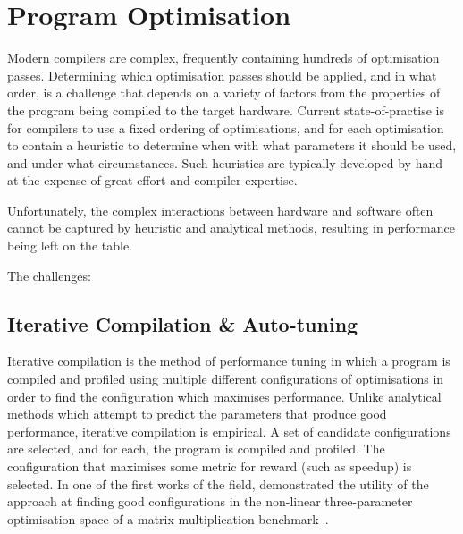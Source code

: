 \section{Program Optimisation}
\label{sec:related-work-optimisation}

Modern compilers are complex, frequently containing hundreds of optimisation passes. Determining which optimisation passes should be applied, and in what order, is a challenge that depends on a variety of factors from the properties of the program being compiled to the target hardware. Current state-of-practise is for compilers to use a fixed ordering of optimisations, and for each optimisation to contain a heuristic to determine when with what parameters it should be used, and under what circumstances. Such heuristics are typically developed by hand at the expense of great effort and compiler expertise.

Unfortunately, the complex interactions between hardware and software often cannot be captured by heuristic and analytical methods, resulting in performance being left on the table.

The challenges:




\subsection{Iterative Compilation \& Auto-tuning}

Iterative compilation is the method of performance tuning in which a program is compiled and profiled using multiple different configurations of optimisations in order to find the configuration which maximises performance. Unlike analytical methods which attempt to predict the parameters that produce good performance, iterative compilation is empirical. A set of candidate configurations are selected, and for each, the program is compiled and profiled. The configuration that maximises some metric for reward (such as speedup) is selected. In one of the first works of the field, \citeauthor{Bodin1998} demonstrated the utility of the approach at finding good configurations in the non-linear three-parameter optimisation space of a matrix multiplication benchmark~\cite{Bodin1998}.

